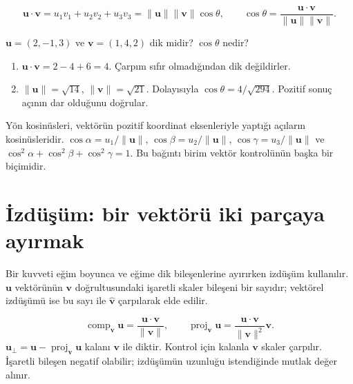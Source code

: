 {\small\[
\mathbf u\cdot\mathbf v=u_1v_1+u_2v_2+u_3v_3=\|\mathbf u\|\|\mathbf v\|\cos\theta,\qquad \cos\theta=\frac{\mathbf u\cdot\mathbf v}{\|\mathbf u\|\|\mathbf v\|}.
\]}
\begin{tcolorbox}[title={Örnek 1.2 | Dersteki açı sorusu},colframe=accent]\(\mathbf u=(2,-1,3)\) ve \(\mathbf v=(1,4,2)\) dik midir? \(\cos\theta\) nedir?
\par{}\end{tcolorbox}
\begin{tcolorbox}[title={Adım adım çözüm},colback=green!3!white,colframe=green]\begin{enumerate}
\item \(\mathbf u\cdot\mathbf v=2-4+6=4\). Çarpım sıfır olmadığından dik değildirler.
\item \(\|\mathbf u\|=\sqrt{14}\), \(\|\mathbf v\|=\sqrt{21}\). Dolayısıyla \(\cos\theta=4/\sqrt{294}\). Pozitif sonuç açının dar olduğunu doğrular.
\end{enumerate}\end{tcolorbox}
Yön kosinüsleri, vektörün pozitif koordinat eksenleriyle yaptığı açıların kosinüsleridir. \(\cos\alpha=u_1/\|\mathbf u\|\), \(\cos\beta=u_2/\|\mathbf u\|\), \(\cos\gamma=u_3/\|\mathbf u\|\) ve \(\cos^2\alpha+\cos^2\beta+\cos^2\gamma=1\). Bu bağıntı birim vektör kontrolünün başka bir biçimidir.

\section{İzdüşüm: bir vektörü iki parçaya ayırmak}
Bir kuvveti eğim boyunca ve eğime dik bileşenlerine ayırırken izdüşüm kullanılır. \(\mathbf u\) vektörünün \(\mathbf v\) doğrultusundaki işaretli skaler bileşeni bir sayıdır; vektörel izdüşümü ise bu sayı ile \(\widehat{\mathbf v}\) çarpılarak elde edilir.


{\small\[
\operatorname{comp}_{\mathbf v}\mathbf u=\frac{\mathbf u\cdot\mathbf v}{\|\mathbf v\|},\qquad \operatorname{proj}_{\mathbf v}\mathbf u=\frac{\mathbf u\cdot\mathbf v}{\|\mathbf v\|^2}\mathbf v.
\]}
\(\mathbf u_{\perp}=\mathbf u-\operatorname{proj}_{\mathbf v}\mathbf u\) kalanı \(\mathbf v\) ile diktir. Kontrol için kalanla \(\mathbf v\) skaler çarpılır. İşaretli bileşen negatif olabilir; izdüşümün uzunluğu istendiğinde mutlak değer alınır.

